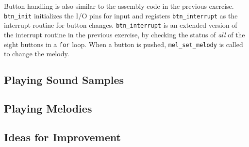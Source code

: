 Button handling is also similar to the assembly code in the previous
exercise. \texttt{btn\_init} initializes the I/O pins for input and
registers \texttt{btn\_interrupt} as the interrupt routine for button
changes. \texttt{btn\_interrupt} is an extended version of the interrupt
routine in the previous exercise, by checking the status of \emph{all}
of the eight buttons in a \texttt{for} loop. When a button is pushed,
\texttt{mel\_set\_melody} is called to change the melody.

\subsection{Playing Sound Samples}
\subsection{Playing Melodies}
\subsection{Ideas for Improvement}

\begin{comment}
Vi burde kommentere litt om math.h, M\_2\_PI-moroa, samt problemer med
lydgenereringen. Også kommentere at sinus er alt for treg til å kunne
brukes direkte. 

Tidligere hadde vi problemer med å regne ut toner og lignende, og vi var
usikre på hvorfor vi fikk spraking o.l. Vi prøvde også å sette ned
raten, og det fungerte av ukjente grunner.  Det viser seg at en
kombinasjon av approksimasjoner av sinus samt mye multiplikasjon gjorde
interrupt-handleren tregere enn det vi trodde - og det å sette ned raten
gjorde det mulig interrupt-handleren å produsere lyden vi ønsket, men
med en dårligere kvalitet.
\end{comment}
